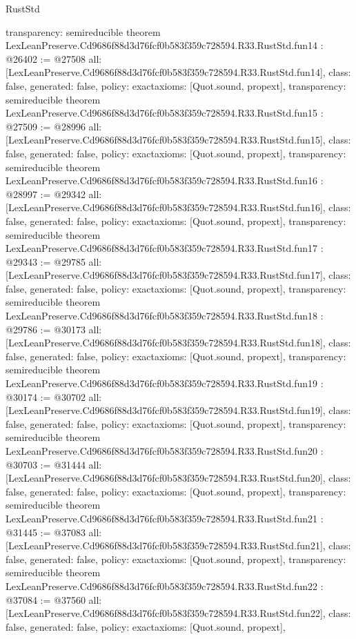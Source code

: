 \begin{lexlean}{RustStd}
\begin{coremodule}
{  transparency: semireducible
}
theorem LexLeanPreserve.Cd9686f88d3d76fcf0b583f359c728594.R33.RustStd.fun14 : @26402 := @27508 {
  all: [LexLeanPreserve.Cd9686f88d3d76fcf0b583f359c728594.R33.RustStd.fun14],
  class: false,
  generated: false,
  policy: exact{axioms: [Quot.sound, propext]},
  transparency: semireducible
}
theorem LexLeanPreserve.Cd9686f88d3d76fcf0b583f359c728594.R33.RustStd.fun15 : @27509 := @28996 {
  all: [LexLeanPreserve.Cd9686f88d3d76fcf0b583f359c728594.R33.RustStd.fun15],
  class: false,
  generated: false,
  policy: exact{axioms: [Quot.sound, propext]},
  transparency: semireducible
}
theorem LexLeanPreserve.Cd9686f88d3d76fcf0b583f359c728594.R33.RustStd.fun16 : @28997 := @29342 {
  all: [LexLeanPreserve.Cd9686f88d3d76fcf0b583f359c728594.R33.RustStd.fun16],
  class: false,
  generated: false,
  policy: exact{axioms: [Quot.sound, propext]},
  transparency: semireducible
}
theorem LexLeanPreserve.Cd9686f88d3d76fcf0b583f359c728594.R33.RustStd.fun17 : @29343 := @29785 {
  all: [LexLeanPreserve.Cd9686f88d3d76fcf0b583f359c728594.R33.RustStd.fun17],
  class: false,
  generated: false,
  policy: exact{axioms: [Quot.sound, propext]},
  transparency: semireducible
}
theorem LexLeanPreserve.Cd9686f88d3d76fcf0b583f359c728594.R33.RustStd.fun18 : @29786 := @30173 {
  all: [LexLeanPreserve.Cd9686f88d3d76fcf0b583f359c728594.R33.RustStd.fun18],
  class: false,
  generated: false,
  policy: exact{axioms: [Quot.sound, propext]},
  transparency: semireducible
}
theorem LexLeanPreserve.Cd9686f88d3d76fcf0b583f359c728594.R33.RustStd.fun19 : @30174 := @30702 {
  all: [LexLeanPreserve.Cd9686f88d3d76fcf0b583f359c728594.R33.RustStd.fun19],
  class: false,
  generated: false,
  policy: exact{axioms: [Quot.sound, propext]},
  transparency: semireducible
}
theorem LexLeanPreserve.Cd9686f88d3d76fcf0b583f359c728594.R33.RustStd.fun20 : @30703 := @31444 {
  all: [LexLeanPreserve.Cd9686f88d3d76fcf0b583f359c728594.R33.RustStd.fun20],
  class: false,
  generated: false,
  policy: exact{axioms: [Quot.sound, propext]},
  transparency: semireducible
}
theorem LexLeanPreserve.Cd9686f88d3d76fcf0b583f359c728594.R33.RustStd.fun21 : @31445 := @37083 {
  all: [LexLeanPreserve.Cd9686f88d3d76fcf0b583f359c728594.R33.RustStd.fun21],
  class: false,
  generated: false,
  policy: exact{axioms: [Quot.sound, propext]},
  transparency: semireducible
}
theorem LexLeanPreserve.Cd9686f88d3d76fcf0b583f359c728594.R33.RustStd.fun22 : @37084 := @37560 {
  all: [LexLeanPreserve.Cd9686f88d3d76fcf0b583f359c728594.R33.RustStd.fun22],
  class: false,
  generated: false,
  policy: exact{axioms: [Quot.sound, propext]},
}
\end{coremodule}
\end{lexlean}
